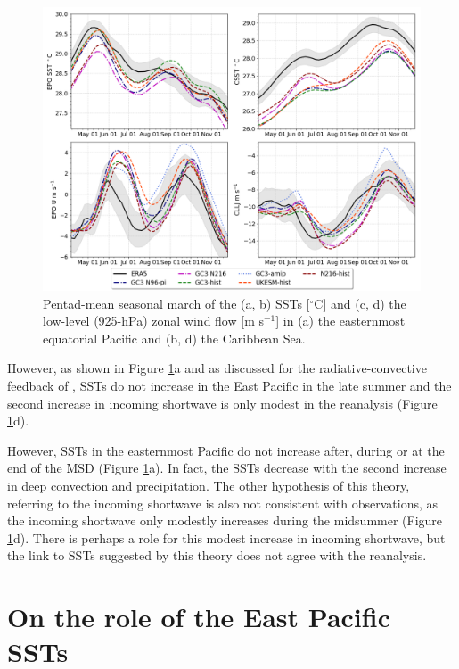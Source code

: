  \begin{figure}[t!]
\includegraphics[width=\linewidth]{figures/index_seasonal}
\caption{Pentad-mean seasonal march of the (a, b) SSTs [$^\circ$C] and (c, d) the low-level (925-hPa) zonal wind flow [m s$^{-1}$] in (a) the easternmost equatorial Pacific and (b, d) the Caribbean Sea.}
\label{fig:csst}
\end{figure}


However, as shown in Figure \ref{fig:csst}a and as discussed for the radiative-convective feedback of \cite{magana1999}, SSTs do not increase in the East Pacific in the late summer and the second increase in incoming shortwave is only modest in the reanalysis (Figure \ref{fig:csst}d). 

 However, SSTs in the easternmost Pacific do not increase after, during or at the end of the MSD (Figure \ref{fig:csst}a). 
In fact, the SSTs decrease with the second increase in deep convection and precipitation. The other hypothesis of this theory, referring to the incoming shortwave is also not consistent with observations, as the incoming shortwave only modestly increases during the midsummer (Figure \ref{fig:csst}d). There is perhaps a role for this modest increase in incoming shortwave, but the link to SSTs suggested by this theory does not agree with the reanalysis. 


\section{On the role of the East Pacific SSTs}



